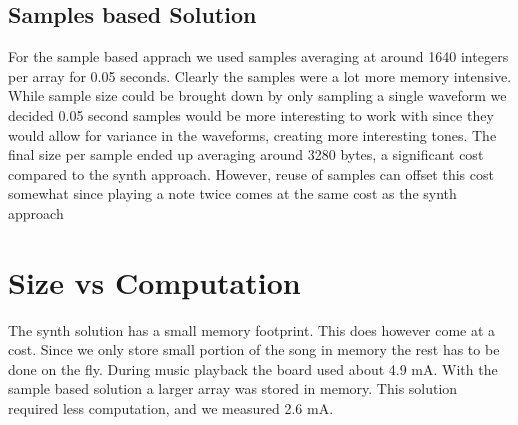 \subsection{Samples based Solution}
For the sample based apprach we used samples averaging at around 1640 integers per array for 0.05 seconds. Clearly the samples were a lot more memory intensive. While sample size could be brought down by only sampling a single waveform we decided 0.05 second samples would be more interesting to work with since they would allow for variance in the waveforms, creating more interesting tones. The final size per sample ended up averaging around 3280 bytes, a significant cost compared to the synth approach. However, reuse of samples can offset this cost somewhat since playing a note twice comes at the same cost as the synth approach

\section{Size vs Computation}
The synth solution has a small memory footprint. This does however come at a cost. Since we only store small portion of the song in memory the rest has to be done on the fly. During music playback the board used about 4.9 mA. With the sample based solution a larger array was stored in memory. This solution required less computation, and we measured 2.6 mA.
